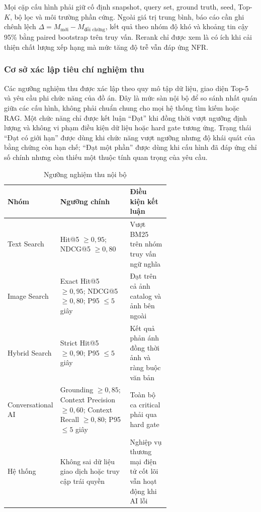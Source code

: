 Mọi cặp cấu hình phải giữ cố định snapshot, query set, ground truth, seed, Top-$K$, bộ lọc và môi trường phần cứng. Ngoài giá trị trung bình, báo cáo cần ghi chênh lệch $\Delta=M_{\text{mới}}-M_{\text{đối chứng}}$, kết quả theo nhóm độ khó và khoảng tin cậy 95\% bằng paired bootstrap trên truy vấn. Rerank chỉ được xem là có ích khi cải thiện chất lượng xếp hạng mà mức tăng độ trễ vẫn đáp ứng NFR.

\subsubsection{Cơ sở xác lập tiêu chí nghiệm thu}

Các ngưỡng nghiệm thu được xác lập theo quy mô tập dữ liệu, giao diện Top-5 và yêu cầu phi chức năng của đồ án. Đây là mức sàn nội bộ để so sánh nhất quán giữa các cấu hình, không phải chuẩn chung cho mọi hệ thống tìm kiếm hoặc RAG. Một chức năng chỉ được kết luận \enquote{Đạt} khi đồng thời vượt ngưỡng định lượng và không vi phạm điều kiện dữ liệu hoặc hard gate tương ứng. Trạng thái \enquote{Đạt có giới hạn} được dùng khi chức năng vượt ngưỡng nhưng độ khái quát của bằng chứng còn hạn chế; \enquote{Đạt một phần} được dùng khi cấu hình đã đáp ứng chỉ số chính nhưng còn thiếu một thuộc tính quan trọng của yêu cầu.

\begin{table}[H]
\centering
\caption{Ngưỡng nghiệm thu nội bộ}
\label{tab:eval-gates}
\begin{tabularx}{\linewidth}{|p{0.21\linewidth}|p{0.43\linewidth}|X|}
\hline
\textbf{Nhóm} & \textbf{Ngưỡng chính} & \textbf{Điều kiện kết luận} \\ \hline
Text Search & Hit@5 $\geq 0{,}95$; NDCG@5 $\geq 0{,}80$ & Vượt BM25 trên nhóm truy vấn ngữ nghĩa \\ \hline
Image Search & Exact Hit@5 $\geq 0{,}95$; NDCG@5 $\geq 0{,}80$; P95 $\leq 5$ giây & Đạt trên cả ảnh catalog và ảnh bên ngoài \\ \hline
Hybrid Search & Strict Hit@5 $\geq 0{,}90$; P95 $\leq 5$ giây & Kết quả phản ánh đồng thời ảnh và ràng buộc văn bản \\ \hline
Conversational AI & Grounding $\geq 0{,}85$; Context Precision $\geq 0{,}60$; Context Recall $\geq 0{,}80$; P95 $\leq 5$ giây & Toàn bộ ca critical phải qua hard gate \\ \hline
Hệ thống & Không sai dữ liệu giao dịch hoặc truy cập trái quyền & Nghiệp vụ thương mại điện tử cốt lõi vẫn hoạt động khi AI lỗi \\ \hline
\end{tabularx}
\end{table}

